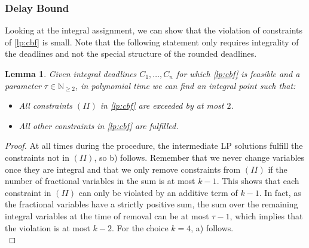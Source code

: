 \documentclass[11pt]{article}
\newtheorem{lemma}[theorem]{Lemma}
\begin{document}
\subsubsection*{Delay Bound}
\noindent Looking at the integral assignment, we can show that the violation of constraints of \ref{lp:cbf} is small. Note that the following statement only requires integrality of the deadlines and not the special structure of the rounded deadlines.
\begin{lemma}\label{lemma:cbflpviolation}
Given integral deadlines $C_1,\dotsc,C_n$ for which \ref{lp:cbf} is feasible and a parameter $\tau \in \mathbb{N}_{\ge 2}$, in polynomial time we can find an integral point such that:
\begin{itemize}
    \item[a)] All constraints $(II)$ in \ref{lp:cbf} are exceeded by at most $2$.
    \item[b)] All other constraints in \ref{lp:cbf} are fulfilled.
\end{itemize}
\end{lemma}
\begin{proof}
At all times during the procedure, the intermediate LP solutions fulfill the constraints not in $(II)$, so b) follows.
Remember that we never change variables once they are integral and that we only remove constraints from $(II)$ if the number of fractional variables in the sum is at most $k-1$. This shows that each constraint in $(II)$ can only be violated by an additive term of $k-1$. In fact, as the fractional variables have a strictly positive sum, the sum over the remaining integral variables at the time of removal can be at most $\tau-1$, which implies that the violation is at most $k-2$. For the choice $k=4$, a) follows.\\
\end{proof}
\end{document}

